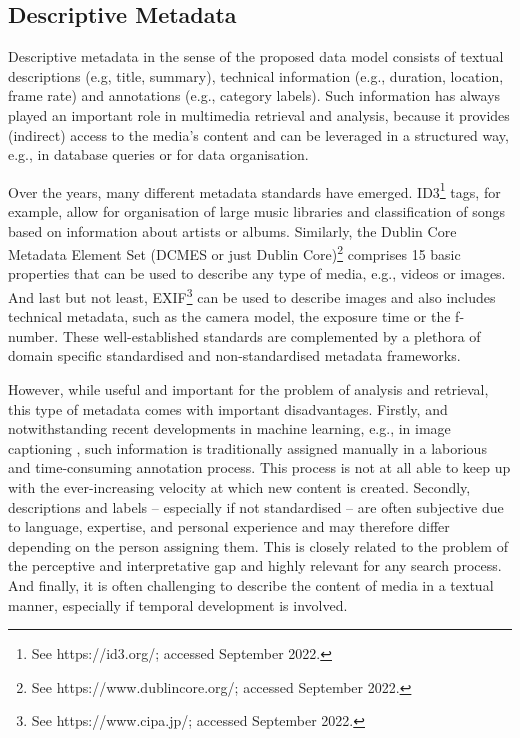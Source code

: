 \subsection{Descriptive Metadata}
Descriptive metadata in the sense of the proposed data model consists of textual descriptions (e.g, title, summary), technical information (e.g., duration, location, frame rate) and annotations (e.g., category labels). Such information has always played an important role in multimedia retrieval and analysis, because it provides (indirect) access to the media's content and can be leveraged in a structured way, e.g., in database queries or for data organisation.

Over the years, many different metadata standards have emerged. ID3\footnote{See https://id3.org/; accessed September 2022.} tags, for example, allow for organisation of large music libraries and classification of songs based on information about artists or albums. Similarly, the Dublin Core Metadata Element Set (DCMES or just Dublin Core)\footnote{See https://www.dublincore.org/; accessed September 2022.} comprises 15 basic properties that can be used to describe any type of media, e.g., videos or images. And last but not least, EXIF\footnote{See https://www.cipa.jp/; accessed September 2022.} can be used to describe images and also includes technical metadata, such as the camera model, the exposure time or the f-number. These well-established standards are complemented by a plethora of domain specific standardised and non-standardised metadata frameworks.

However, while useful and important for the problem of analysis and retrieval, this type of metadata comes with important disadvantages. Firstly, and notwithstanding recent developments in machine learning, e.g., in image captioning \cite{Hossain:2019Comprehensive}, such information is traditionally assigned manually in a laborious and time-consuming annotation process. This process is not at all able to keep up with the ever-increasing velocity at which new content is created. Secondly, descriptions and labels -- especially if not standardised -- are often subjective due to language, expertise, and personal experience and may therefore differ depending on the person assigning them. This is closely related to the problem of the perceptive and interpretative gap \cite{Rossetto:2018Multi} and highly relevant for any search process. And finally, it is often challenging to describe the content of media in a textual manner, especially if temporal development is involved.

